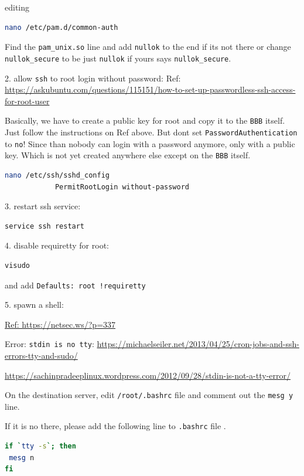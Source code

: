 \documentclass[
	fontsize=10pt
	paper=a4
]{scrartcl}
\begin{document}
editing
\begin{lstlisting}[language=bash]
nano /etc/pam.d/common-auth
\end{lstlisting}
Find the \texttt{pam\_unix.so} line and add \texttt{nullok} to the end if its
not there or change \texttt{nullok\_secure} to be just \texttt{nullok} if
yours says \texttt{nullok\_secure}.

2. allow \texttt{ssh} to root login without password:
Ref: \url{https://askubuntu.com/questions/115151/how-to-set-up-passwordless-ssh-access-for-root-user}

Basically, we have to create a public key for root and copy it
to the \texttt{BBB} itself. Just follow the instructions on Ref above.
But dont set \texttt{PasswordAuthentication} to \texttt{no}! 
Since than nobody can login with a password anymore, only with a public key. Which is not yet created anywhere else except on the \texttt{BBB} itself.

\begin{lstlisting}[language=bash]
        nano /etc/ssh/sshd_config
            PermitRootLogin without-password
\end{lstlisting}

3. restart ssh service:
\begin{lstlisting}[language=bash]
service ssh restart
\end{lstlisting}

4. disable requiretty for root:
\begin{lstlisting}[language=bash]
visudo
\end{lstlisting}
and add \texttt{Defaults: root !requiretty}

5. spawn a shell:

\url{Ref: https://netsec.ws/?p=337}


Error: \texttt{stdin is no tty}:
\url{https://michaelseiler.net/2013/04/25/cron-jobs-and-ssh-errors-tty-and-sudo/}

\url{https://sachinpradeeplinux.wordpress.com/2012/09/28/stdin-is-not-a-tty-error/}

On the destination server, edit \texttt{/root/.bashrc} file and comment out
the \texttt{mesg y} line.

If it is no there, please add the following line to \texttt{.bashrc} file .

\begin{lstlisting}[language=bash]
if `tty -s`; then
 mesg n
fi
\end{lstlisting}
\end{document}
